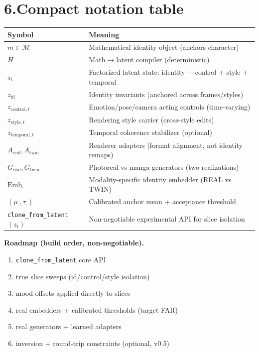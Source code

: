 \documentclass[10pt]{article}
\newcommand{\cM}{\mathcal{M}}
\begin{document}
\section*{6.\;Compact notation table}
\vspace{-0.25em}
\begin{center}
\small
\begin{tabular}{@{}>{\raggedright\arraybackslash}p{2.5cm}p{12.0cm}@{}}
\toprule
Symbol & Meaning \\
\midrule
$m\in\cM$ & Mathematical identity object (anchors character) \\
$H$ & Math$\to$latent compiler (deterministic) \\
$z_t$ & Factorized latent state: identity + control + style + temporal \\
$z_{\mathrm{id}}$ & Identity invariants (anchored across frames/styles) \\
$z_{\mathrm{control},t}$ & Emotion/pose/camera acting controls (time-varying) \\
$z_{\mathrm{style},t}$ & Rendering style carrier (cross-style edits) \\
$z_{\mathrm{temporal},t}$ & Temporal coherence stabilizer (optional) \\
$A_{\text{real}},A_{\text{twin}}$ & Renderer adapters (format alignment, not identity remaps) \\
$G_{\text{real}},G_{\text{twin}}$ & Photoreal vs manga generators (two realizations) \\
$\mathrm{Emb}_{\cdot}$ & Modality-specific identity embedder (REAL vs TWIN) \\
$(\mu_{\cdot},\tau_{\cdot})$ & Calibrated anchor mean + acceptance threshold \\
\texttt{clone\_from\_latent}$(z_t)$ & Non-negotiable experimental API for slice isolation \\
\bottomrule
\end{tabular}
\end{center}
\vspace{0.2em}
\noindent\textbf{Roadmap (build order, non-negotiable).}
\begin{enumerate}[leftmargin=1.6em,itemsep=0.15em,topsep=0.2em]
\item \texttt{clone\_from\_latent} core API
\item true slice sweeps (id/control/style isolation)
\item mood offsets applied directly to slices
\item real embedders + calibrated thresholds (target FAR)
\item real generators + learned adapters
\item inversion + round-trip constraints (optional, v0.5)
\end{enumerate}
\end{document}
